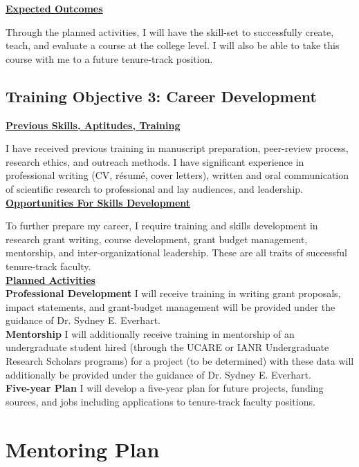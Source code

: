 \documentclass[12pt,letterpaper]{article}
\begin{document}
\noindent \textbf{\underline{Expected Outcomes}}

Through the planned activities, I will have the skill-set to successfully create, teach, and evaluate a course at the college level. I will also be able to take this course with me to a future tenure-track position. 

\subsection{Training Objective 3: Career Development}

\noindent \textbf{\underline{Previous Skills, Aptitudes, Training}}

I have received previous training in manuscript preparation, peer-review process, research ethics, and outreach methods. I have significant experience in professional writing (CV, r\'esum\'e, cover letters), written and oral communication of scientific research to professional and lay audiences, and leadership.\\

\noindent \textbf{\underline{Opportunities For Skills Development}}

To further prepare my career, I require training and skills development in research grant writing, course development, grant budget management,
mentorship, and inter-organizational leadership. These are all traits of successful tenure-track faculty.\\

\noindent \textbf{\underline{Planned Activities}}\\
\noindent \textbf{Professional Development} I will receive training in writing grant proposals, impact statements, and grant-budget management will be provided under the guidance of Dr. Sydney E. Everhart.\\
\noindent \textbf{Mentorship} I will additionally receive training in mentorship of an undergraduate student hired (through the UCARE or IANR Undergraduate Research Scholars programs) for a project (to be determined) with these data will additionally be provided under the guidance of Dr. Sydney E. Everhart. \\
\noindent \textbf{Five-year Plan} I will develop a five-year plan for future projects, funding sources, and jobs including applications to tenure-track faculty positions.




\section{Mentoring Plan}
\end{document}
